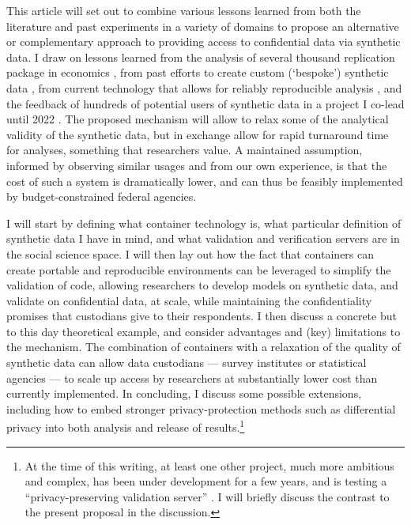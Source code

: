 \documentclass[inline]{hdsr}
\begin{document}
This article will set out to combine various lessons learned from both the literature and past experiments in a variety of domains to propose an alternative or complementary approach to providing access to confidential data via synthetic data. I draw on lessons learned from the analysis of several thousand replication package in economics \citep{vilhuber_report_2025}, from past efforts to create custom (`bespoke') synthetic data \citep{nowok_providing_2017}, from current technology that allows for reliably reproducible analysis \citep[\textbf{containers}, see ][for an introduction]{boettiger_introduction_2015}, and the feedback of hundreds of potential users of synthetic data in a project I co-lead until 2022 \citep{vilhuber_end_2022}. The proposed mechanism will allow to relax some of the analytical validity of the synthetic data, but in exchange allow for rapid turnaround time for analyses, something that researchers value. A maintained assumption, informed by observing similar usages and from our own experience, is that the cost of such a system is dramatically lower, and can thus be feasibly implemented by budget-constrained federal agencies. 


I will start by defining what container technology is, what particular definition of synthetic data I have in mind, and what validation and verification servers are in the social science space. I will then lay out how the fact that containers can create portable and reproducible environments can be leveraged to simplify the validation of code, allowing researchers to develop models on synthetic data, and validate on confidential data, at scale, while maintaining the confidentiality promises that custodians give to their respondents. I then discuss a concrete but to this day theoretical example, and consider advantages and (key) limitations to the mechanism. The combination of containers with a relaxation of the quality of synthetic data can allow data custodians --- survey institutes or statistical agencies --- to scale up access by researchers at substantially lower cost than currently implemented. In concluding, I discuss some possible extensions, including how to embed stronger privacy-protection methods such as differential privacy into both analysis and release of results.\footnote{At the time of this writing, at least one other project, much more ambitious and complex, has been under development for a few years, and is testing a ``privacy-preserving validation server'' \citep{burman2018,tyagi_privacy-preserving_2024}. I will briefly discuss the contrast to the present proposal in the discussion.}
\end{document}
